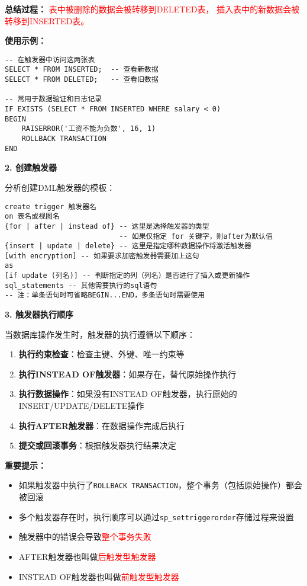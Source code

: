 \textbf{总结过程：} \textcolor{red}{表中被删除的数据会被转移到DELETED表，
插入表中的新数据会被转移到INSERTED表。}

\begin{mdframed}[backgroundcolor=gray!10]
  \textbf{使用示例：}
\begin{verbatim}
-- 在触发器中访问这两张表
SELECT * FROM INSERTED;  -- 查看新数据
SELECT * FROM DELETED;   -- 查看旧数据

-- 常用于数据验证和日志记录
IF EXISTS (SELECT * FROM INSERTED WHERE salary < 0)
BEGIN
    RAISERROR('工资不能为负数', 16, 1)
    ROLLBACK TRANSACTION
END
\end{verbatim}
\end{mdframed}

\textbf{2. 创建触发器}

\qquad 分析创建DML触发器的模板：

\begin{mdframed}[backgroundcolor=gray!10]
\begin{verbatim}
create trigger 触发器名
on 表名或视图名
{for | after | instead of} -- 这里是选择触发器的类型
                           -- 如果仅指定 for 关键字，则after为默认值
{insert | update | delete} -- 这里是指定哪种数据操作将激活触发器
[with encryption] -- 如果要求加密触发器需要加上这句
as
[if update (列名)] -- 判断指定的列（列名）是否进行了插入或更新操作
sql_statements -- 其他需要执行的sql语句
-- 注：单条语句时可省略BEGIN...END，多条语句时需要使用
\end{verbatim}
\end{mdframed}

\textbf{3. 触发器执行顺序}

\qquad 当数据库操作发生时，触发器的执行遵循以下顺序：

\begin{enumerate}
  \item \textbf{执行约束检查}：检查主键、外键、唯一约束等
  \item \textbf{执行INSTEAD OF触发器}：如果存在，替代原始操作执行
  \item \textbf{执行数据操作}：如果没有INSTEAD OF触发器，执行原始的INSERT/UPDATE/DELETE操作
  \item \textbf{执行AFTER触发器}：在数据操作完成后执行
  \item \textbf{提交或回滚事务}：根据触发器执行结果决定
\end{enumerate}

\begin{mdframed}[backgroundcolor=yellow!10]
  \textbf{重要提示：}
  \begin{itemize}
    \item 如果触发器中执行了\texttt{ROLLBACK TRANSACTION}，整个事务（包括原始操作）都会被回滚
    \item 多个触发器存在时，执行顺序可以通过\texttt{sp\_settriggerorder}存储过程来设置
    \item 触发器中的错误会导致\textcolor{red}{整个事务失败}
    \item AFTER触发器也叫做\textcolor{red}{后触发型触发器}
    \item INSTEAD OF触发器也叫做\textcolor{red}{前触发型触发器}
  \end{itemize}
\end{mdframed}


